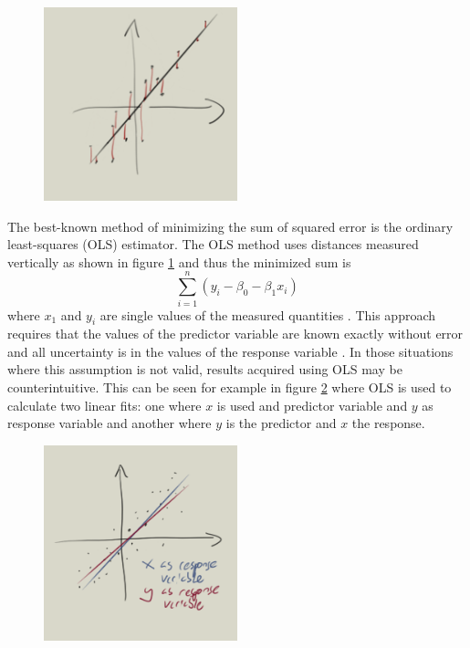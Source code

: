 \documentclass[english, oneside]{HYgradu}
\begin{document}
\begin{figure}
   \centering
   \includegraphics[width=0.5\textwidth]{kuvat/OLS-sketch.png}
   \caption{}
   \label{fig:OLS}
\end{figure}

\reversemarginpar
{}
The best-known method of minimizing the sum of squared error is the ordinary least-squares (OLS) estimator. The OLS method uses distances measured vertically as shown in figure \ref{fig:OLS} and thus the minimized sum is
\begin{equation}
	\sum_{i=1}^n (y_i - \beta_0 - \beta_1 x_i)
\end{equation}
where $x_1$ and $y_i$ are single values of the measured quantities \citep{feigelson2012modern}. This approach requires that the values of the predictor variable are known exactly without error and all uncertainty is in the values of the response variable \citep{feigelson2012modern}. In those situations where this assumption is not valid, results acquired using OLS may be counterintuitive. This can be seen for example in figure \ref{fig:OLSproblem} where OLS is used to calculate two linear fits: one where $x$ is used and predictor variable and $y$ as response variable and another where $y$ is the predictor and $x$ the response.

\begin{figure}
   \centering
   \includegraphics[width=0.5\textwidth]{kuvat/OLSproblem-sketch.png}
   \caption{}
   \label{fig:OLSproblem}
\end{figure}
\end{document}
